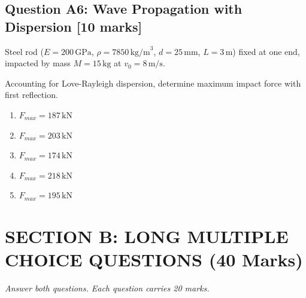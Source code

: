 \documentclass[12pt,a4paper]{article}
\begin{document}
\begin{questionbox}
\subsection*{Question A6: Wave Propagation with Dispersion [10 marks]}
Steel rod ($E = 200\,\text{GPa}$, $\rho = 7850\,\text{kg/m}^3$, $d = 25\,\text{mm}$, $L = 3\,\text{m}$) 
fixed at one end, impacted by mass $M = 15\,\text{kg}$ at $v_0 = 8\,\text{m/s}$.

\begin{center}
\end{center}

Accounting for Love-Rayleigh dispersion, determine maximum impact force with first reflection.

\begin{mcqbox}
\begin{enumerate}[label=(\Alph*),leftmargin=*]
    \item $F_{max} = 187\,\text{kN}$
    \item $F_{max} = 203\,\text{kN}$
    \item $F_{max} = 174\,\text{kN}$
    \item $F_{max} = 218\,\text{kN}$
    \item $F_{max} = 195\,\text{kN}$
\end{enumerate}
\end{mcqbox}
\end{questionbox}

\newpage
\section*{SECTION B: LONG MULTIPLE CHOICE QUESTIONS (40 Marks)}
{\large\itshape Answer both questions. Each question carries 20 marks.}
\vspace{0.5cm}
\end{document}
